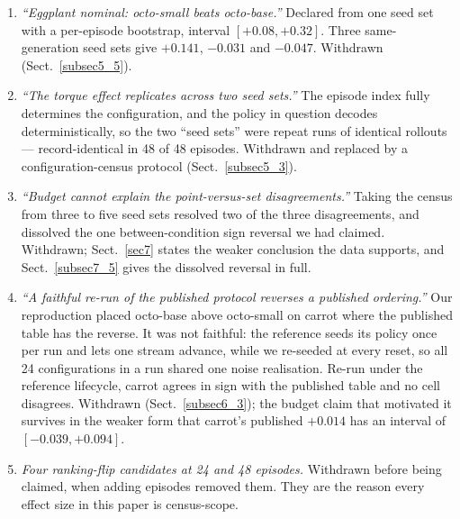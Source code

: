 \documentclass[pdflatex,iicol,sn-apa]{sn-jnl}
\theoremstyle{remark}
\begin{document}
\begin{appendices}
\begin{enumerate}
\item \emph{``Eggplant nominal: octo-small beats octo-base.''} Declared from one seed set with a
per-episode bootstrap, interval $[+0.08, +0.32]$. Three same-generation seed sets give $+0.141$,
$-0.031$ and $-0.047$. Withdrawn (Sect.~\ref{subsec5_5}).
\item \emph{``The torque effect replicates across two seed sets.''} The episode index fully
determines the configuration, and the policy in question decodes deterministically, so the two
``seed sets'' were repeat runs of identical rollouts --- record-identical in 48 of 48 episodes.
Withdrawn and replaced by a configuration-census protocol (Sect.~\ref{subsec5_3}).
\item \emph{``Budget cannot explain the point-versus-set disagreements.''} Taking the census from
three to five seed sets resolved two of the three disagreements, and dissolved the one
between-condition sign reversal we had claimed. Withdrawn; Sect.~\ref{sec7} states the weaker
conclusion the data supports, and Sect.~\ref{subsec7_5} gives the dissolved reversal in full.
\item \emph{``A faithful re-run of the published protocol reverses a published ordering.''} Our
reproduction placed octo-base above octo-small on carrot where the published table has the reverse.
It was not faithful: the reference seeds its policy once per run and lets one stream advance, while
we re-seeded at every reset, so all 24 configurations in a run shared one noise realisation. Re-run
under the reference lifecycle, carrot agrees in sign with the published table and no cell disagrees.
Withdrawn (Sect.~\ref{subsec6_3}); the budget claim that motivated it survives in the weaker form
that carrot's published $+0.014$ has an interval of $[-0.039, +0.094]$.
\item \emph{Four ranking-flip candidates at 24 and 48 episodes.} Withdrawn before being claimed,
when adding episodes removed them. They are the reason every effect size in this paper is
census-scope.
\end{enumerate}


\end{appendices}
\end{document}
